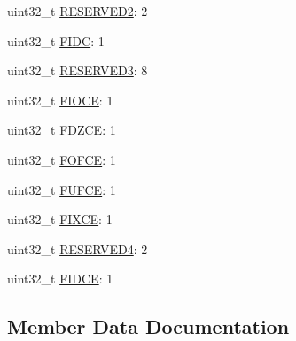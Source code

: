 \begin{DoxyCompactItemize}
uint32\+\_\+t \hyperlink{struct__hw__mcm__iscr_1_1__hw__mcm__iscr__bitfields_a02a6963ab453ffdf30e200fe937321bf}{R\+E\+S\+E\+R\+V\+E\+D2}\+: 2
\item 
uint32\+\_\+t \hyperlink{struct__hw__mcm__iscr_1_1__hw__mcm__iscr__bitfields_a6eacff1e017085613564d097eda30de5}{F\+I\+DC}\+: 1
\item 
uint32\+\_\+t \hyperlink{struct__hw__mcm__iscr_1_1__hw__mcm__iscr__bitfields_aab4b4bf6dca1b0182e6863f99b8b3874}{R\+E\+S\+E\+R\+V\+E\+D3}\+: 8
\item 
uint32\+\_\+t \hyperlink{struct__hw__mcm__iscr_1_1__hw__mcm__iscr__bitfields_ade21770fa22d405f3dd96b8754ed3e41}{F\+I\+O\+CE}\+: 1
\item 
uint32\+\_\+t \hyperlink{struct__hw__mcm__iscr_1_1__hw__mcm__iscr__bitfields_a33d66c179ca9fc0c0d8be3345becf17a}{F\+D\+Z\+CE}\+: 1
\item 
uint32\+\_\+t \hyperlink{struct__hw__mcm__iscr_1_1__hw__mcm__iscr__bitfields_a1a06ea5eea9e42528ef17c4e1e6fded4}{F\+O\+F\+CE}\+: 1
\item 
uint32\+\_\+t \hyperlink{struct__hw__mcm__iscr_1_1__hw__mcm__iscr__bitfields_acf0293b2426e7a53cea51dfbe3138baa}{F\+U\+F\+CE}\+: 1
\item 
uint32\+\_\+t \hyperlink{struct__hw__mcm__iscr_1_1__hw__mcm__iscr__bitfields_a9f257a019e72ac4cfa0662cd8526f53d}{F\+I\+X\+CE}\+: 1
\item 
uint32\+\_\+t \hyperlink{struct__hw__mcm__iscr_1_1__hw__mcm__iscr__bitfields_abd4eccc45cf6ce6e1513bb974bb5497f}{R\+E\+S\+E\+R\+V\+E\+D4}\+: 2
\item 
uint32\+\_\+t \hyperlink{struct__hw__mcm__iscr_1_1__hw__mcm__iscr__bitfields_a9c9cb07d8301c3ea3f0dfe8a5d93682d}{F\+I\+D\+CE}\+: 1
\end{DoxyCompactItemize}


\subsection{Member Data Documentation}

